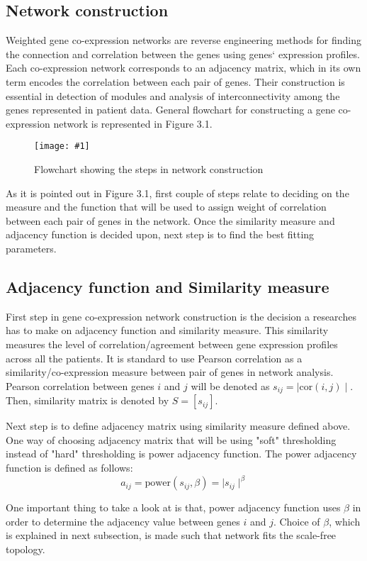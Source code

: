 \documentclass{ba-kecs}
\numberwithin{figure}{section}
\numberwithin{equation}{section}
\newcommand{\dkepicH}[2]{ %
	\begin{figure}[H] %
	\texttt{[image: \#1]}
	\caption{#2}
	\label{#1}
	\end{figure}
}
\begin{document}
\subsection{Network construction}

Weighted gene co-expression networks are reverse engineering methods for finding the connection and correlation between the genes using genes` expression profiles. Each co-expression network corresponds to an adjacency matrix, which in its own term encodes the correlation between each pair of genes. Their construction is essential in detection of modules and analysis of interconnectivity among the genes represented in patient data. General flowchart for constructing a gene co-expression network is represented in Figure 3.1.

\dkepicH{flowchart}{Flowchart showing the steps in network construction}
As it is pointed out in Figure 3.1, first couple of steps relate to deciding on the measure and the function that will be used to assign weight of correlation between each pair of genes in the network. Once the similarity measure and adjacency function is decided upon, next step is to find the best fitting parameters.


\subsection{Adjacency function and Similarity measure}

First step in gene co-expression network construction is the decision a researches has to make on adjacency function and similarity measure. This similarity measures the level of correlation/agreement between gene expression profiles across all the patients. It is standard to use Pearson correlation as a similarity/co-expression measure between pair of genes in network analysis. Pearson correlation between genes $i$ and $j$ will be denoted as $s_{ij} = \mid\mathrm{cor}(i,j)\mid $. Then, similarity matrix is denoted by $S = [s_{ij}] $.

Next step is to define adjacency matrix using similarity measure defined above. One way of choosing adjacency matrix that will be using "soft" thresholding instead of "hard" thresholding is power adjacency function. The power adjacency function is defined as follows:
\begin{equation}
a_{ij} = \mathrm{power}(s_{ij},\beta) = \mid s_{ij} \mid^\beta
\end{equation}

One important thing to take a look at is that, power adjacency function uses $\beta$ in order to determine the adjacency value between genes $i$ and $j$. Choice of $\beta$, which is explained in next subsection, is made such that network fits the scale-free topology.
\end{document}
